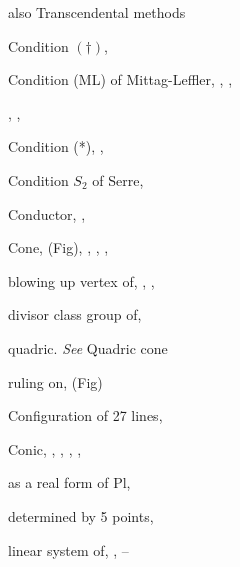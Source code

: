 {{\noindent\hspace*{15.0bp}also Transcendental methods\par
\noindent\hspace*{0.0bp}Condition $(\dagger)$, \par
\noindent\hspace*{0.0bp}Condition (ML) of Mittag-Leffler, , ,\par
\noindent\hspace*{15.0bp}, , \par
\noindent\hspace*{0.0bp}Condition (*), , \par
\noindent\hspace*{0.0bp}Condition $S_2$ of Serre, \par
\noindent\hspace*{0.0bp}Conductor, , \par
\noindent\hspace*{0.0bp}Cone,  (Fig), , , , \par
\noindent\hspace*{7.5bp}blowing up vertex of, , , \par
\noindent\hspace*{7.5bp}divisor class group of, \par
\noindent\hspace*{7.5bp}quadric. \emph{See} Quadric cone\par
\noindent\hspace*{7.5bp}ruling on,  (Fig)\par
\noindent\hspace*{0.0bp}Configuration of 27 lines, \par
\noindent\hspace*{0.0bp}Conic, , , , , \par
\noindent\hspace*{7.5bp}as a real form of Pl, \par
\noindent\hspace*{7.5bp}determined by 5 points, \par
\noindent\hspace*{7.5bp}linear system of, , --\par
}}
